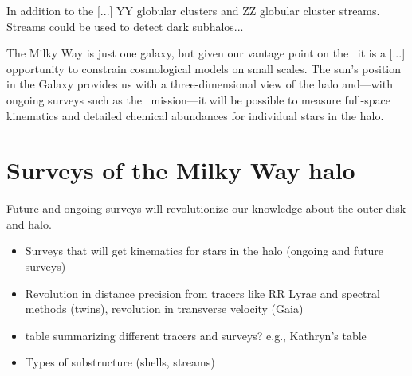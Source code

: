 In addition to the [...] YY globular clusters and ZZ globular cluster streams. Streams could be used to detect dark subhalos...

The Milky Way is just one galaxy, but given our vantage point on the \mwhalo\ it is a [...] opportunity to constrain cosmological models on small scales. The sun's position in the Galaxy provides us with a three-dimensional view of the halo and---with ongoing surveys such as the \gaia\ mission---it will be possible to measure full-space kinematics and detailed chemical abundances for individual stars in the halo. 

\section{Surveys of the Milky Way halo}\label{sec:surveys}

Future and ongoing surveys will revolutionize our knowledge about the outer disk and halo.

\begin{itemize}
	\item Surveys that will get kinematics for stars in the halo (ongoing and future surveys)
	\item Revolution in distance precision from tracers like RR Lyrae and spectral methods (twins), revolution in transverse velocity (Gaia)
	\item table summarizing different tracers and surveys? e.g., Kathryn's table
	\item Types of substructure (shells, streams)
\end{itemize}


